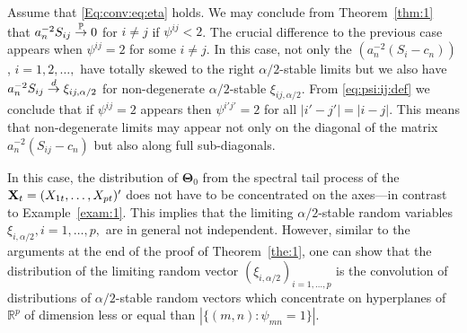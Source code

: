 \begin{example}\label{exam:2}
Assume that \eqref{Eq:conv:eq:eta} holds. We may conclude from Theorem~\ref{thm:1}
that $a_n^{-2} S_{ij}\stackrel{{\mathbb P}}{\rightarrow} 0$ for $i\ne j$ if $\psi^{ij}<2$. The crucial difference to the previous case appears
when $\psi^{ij}=2$ for some $i\ne j$. In this case, not only the $(a_n^{-2}(S_i-c_n))$, $i=1,2,\ldots,$ have 
totally skewed to the right $\alpha/2$-stable limits 
but we also have $a_n^{-2} S_{ij}\stackrel{d}{\rightarrow} \xi_{ij,\alpha/2}$ for non-degenerate $\alpha/2$-stable $\xi_{ij,\alpha/2}$. From \eqref{eq:psi:ij:def}
we conclude that if $\psi^{ij}=2$ appears then $\psi^{i'j'}=2$ for all $|i'-j'|=|i-j|$. This means that non-degenerate limits may appear not only
on the diagonal of the matrix $a_n^{-2}(S_{ij}-c_n)$ but also along full sub-diagonals.
\par
In this case, the distribution of $\boldsymbol{\Theta}_0$ from the spectral tail process of the 
\seq\ ${\bf X}_t=(X_{1t},\ldots,X_{pt})'$ does not have to be concentrated on the axes---in contrast to Example~\ref{exam:1}. 
This implies that the limiting $\alpha/2$-stable random variables $\xi_{i,\alpha/2}, i=1, \ldots, p,$ are in general not independent. However, similar to the arguments at the end of the proof of Theorem~\ref{the:1}, one can show that the distribution of the limiting random vector $(\xi_{i,\alpha/2})_{i=1,\ldots,p}$ is the convolution of distributions of $\alpha/2$-stable random vectors which concentrate on 
hyperplanes of $\mathbb{R}^p$ of dimension less or equal than $|\{(m,n): \psi_{mn}=1\}|$. 
\end{example}

